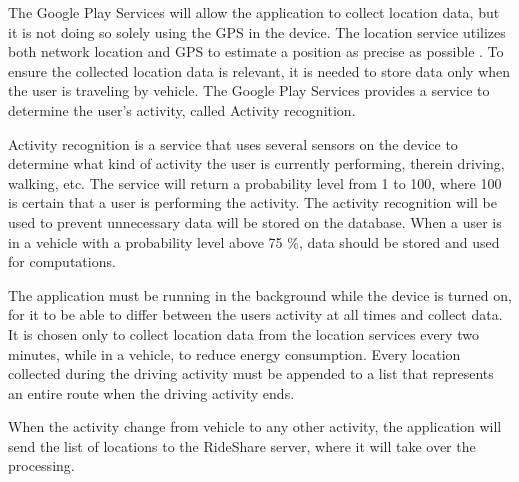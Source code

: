 The Google Play Services will allow the application to collect location data, but it is not doing so solely using the GPS in the device. 
The location service utilizes both network location and GPS to estimate a position as precise as possible \cite{GapiLocation}. 
To ensure the collected location data is relevant, it is needed to store data only when the user is traveling by vehicle.
The Google Play Services provides a service to determine the user's activity, called Activity recognition. 

Activity recognition is a service that uses several sensors on the device to determine what kind of activity the user is currently performing, therein driving, walking, etc.
The service will return a probability level from 1 to 100, where 100 is certain that a user is performing the activity.
The activity recognition will be used to prevent unnecessary data will be stored on the database. 
When a user is in a vehicle with a probability level above 75 \%, data should be stored and used for computations.

The application must be running in the background while the device is turned on, for it to be able to differ between the users activity at all times and collect data. 
It is chosen only to collect location data from the location services every two minutes, while in a vehicle, to reduce energy consumption. 
Every location collected during the driving activity must be appended to a list that represents an entire route when the driving activity ends.

When the activity change from vehicle to any other activity, the application will send the list of locations to the RideShare server, where it will take over the processing. 